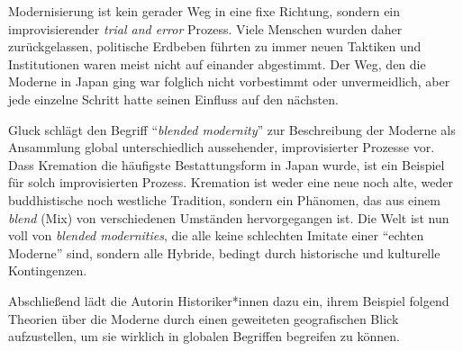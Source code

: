 \documentclass[a4paper, 12pt]{article}
\begin{document}
\begin{onehalfspace}
Modernisierung ist kein gerader Weg in eine fixe Richtung, sondern ein improvisierender \emph{trial and error} Prozess. Viele Menschen wurden daher zurückgelassen, politische Erdbeben führten zu immer neuen Taktiken und Institutionen waren meist nicht auf einander abgestimmt. Der Weg, den die Moderne in Japan ging war folglich nicht vorbestimmt oder unvermeidlich, aber jede einzelne Schritt hatte seinen Einfluss auf den nächsten.

Gluck schlägt den Begriff "`\emph{blended modernity}"' zur Beschreibung der Moderne als Ansammlung global unterschiedlich aussehender, improvisierter Prozesse vor. Dass Kremation die häufigste Bestattungsform in Japan wurde, ist ein Beispiel für solch improvisierten Prozess. Kremation ist weder eine neue noch alte, weder buddhistische noch westliche Tradition, sondern ein Phänomen, das aus einem \emph{blend} (Mix) von verschiedenen Umständen hervorgegangen ist. Die Welt ist nun voll von \emph{blended modernities}, die alle keine schlechten Imitate einer "`echten Moderne"' sind, sondern alle Hybride, bedingt durch historische und kulturelle Kontingenzen.

Abschließend lädt die Autorin Historiker*innen dazu ein, ihrem Beispiel folgend Theorien über die Moderne durch einen geweiteten geografischen Blick aufzustellen, um sie wirklich in globalen Begriffen begreifen zu können.



\end{onehalfspace}
\nocite{*}
%
\printbibliography
\end{document}

